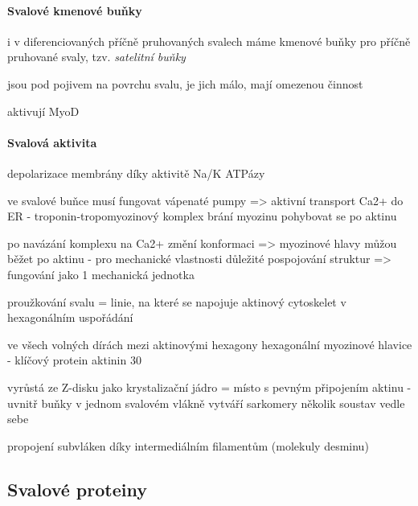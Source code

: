 \documentclass[DIV=8]{scrreprt}
\begin{document}
\paragraph{Svalové kmenové buňky}
\begin{myItemize}[nosep]
    \item i v diferenciovaných příčně pruhovaných svalech máme kmenové buňky pro příčně pruhované svaly, tzv. \emph{satelitní buňky}
    \item jsou pod pojivem na povrchu svalu, je jich málo, mají omezenou činnost
    \item aktivují MyoD
\end{myItemize}



\paragraph{Svalová aktivita}
\begin{myItemize}[nosep]
    \item depolarizace membrány díky aktivitě Na/K ATPázy
    \item ve svalové buňce musí fungovat vápenaté pumpy => aktivní transport Ca2+ do ER - troponin-tropomyozinový komplex brání myozinu pohybovat se po aktinu
    \item po navázání komplexu na Ca2+ změní konformaci => myozinové hlavy můžou běžet po aktinu - pro mechanické vlastnosti důležité pospojování struktur => fungování jako 1 mechanická jednotka
    \item proužkování svalu
= linie, na které se napojuje aktinový cytoskelet v hexagonálním uspořádání
    \item ve všech volných dírách mezi aktinovými hexagony hexagonální myozinové hlavice - klíčový protein aktinin
30
    \item vyrůstá ze Z-disku jako krystalizační jádro = místo s pevným připojením aktinu - uvnitř buňky v jednom svalovém vlákně vytváří sarkomery několik soustav vedle sebe
    \item propojení subvláken díky intermediálním filamentům (molekuly desminu)
\end{myItemize}



\subsection{Svalové proteiny} \label{Svalové proteiny}
\end{document}
